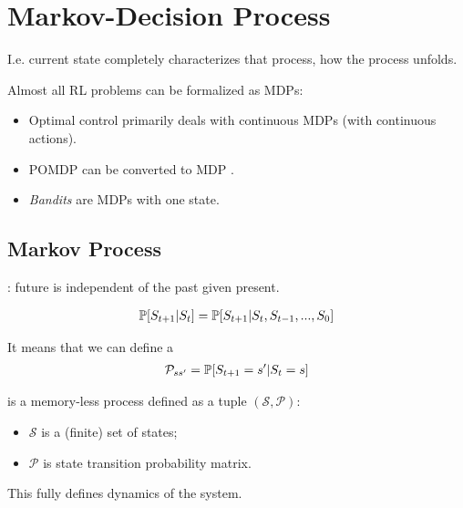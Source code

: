 \section{Markov-Decision Process}


I.e. current state completely characterizes that process, how the process unfolds.

Almost all RL problems can be formalized as MDPs:
\begin{itemize}
	\item Optimal control primarily deals with continuous MDPs (with continuous actions).
	\item POMDP can be converted to MDP	.
	\item \textit{Bandits} are MDPs with one state.
\end{itemize}



\subsection{Markov Process}

: future is independent of the past given present.

\begin{align}
	\mathbb{P}[S_{t+1} | S_t] = 	\mathbb{P}[S_{t+1} | S_t, S_{t-1}, ..., S_{0}]
\end{align}

It means that we can define a 
\begin{align}
	\mathcal{P}_{ss'} = \mathbb{P}[S_{t+1} = s' | S_t = s]
\end{align}

 is a memory-less process defined as a tuple $(\mathcal{S}, \mathcal{P})$:
\begin{itemize}
	\item $\mathcal{S}$ is a (finite) set of states;
	\item $\mathcal{P}$ is state transition probability matrix.
\end{itemize}

This fully defines dynamics of the system.

